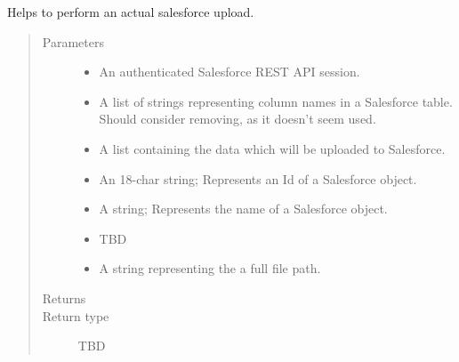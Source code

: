 \documentclass[letterpaper,10pt,english]{sphinxmanual}
\begin{document}
\begin{fulllineitems}
\label{\detokenize{index:ListManagement.utility.processes.upload}}
Helps to perform an actual salesforce upload.
\begin{quote}\begin{description}
\item[{Parameters}] \leavevmode\begin{itemize}
\item {} 
 \textendash{} An authenticated Salesforce REST API session.

\item {} 
 \textendash{} A list of strings representing column names in a Salesforce table.
Should consider removing, as it doesn’t seem used.

\item {} 
 \textendash{} A list containing the data which will be uploaded to Salesforce.

\item {} 
 \textendash{} An 18-char string; Represents an Id of a Salesforce object.

\item {} 
 \textendash{} A string; Represents the name of a Salesforce object.

\item {} 
 \textendash{} TBD

\item {} 
 \textendash{} A string representing the a full file path.

\end{itemize}

\item[{Returns}] \leavevmode


\item[{Return type}] \leavevmode
TBD

\end{description}\end{quote}

\end{fulllineitems}
\end{document}

